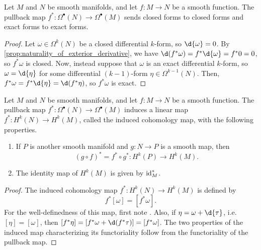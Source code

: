 \documentclass[a4paper,12pt]{article}
\begin{document}
\begin{lemma}\label{lem:pullback_closed_and_exact_forms}
    Let $M$ and $N$ be smooth manifolds, and let $f \colon M \to N$ be a smooth function.
    The pullback map $f^* \colon \Omega^\bullet(N) \to \Omega^\bullet(M)$ sends closed forms to closed forms and exact forms to exact forms.
\end{lemma}
\begin{proof}
    Let $\omega \in \Omega^k(N)$ be a closed differential $k$-form, so $\d{\omega} = 0$.
    By \cref{prop:naturality_of_exterior_derivative}, we have $\d(f^*\omega) = f^*\d{\omega} = f^*0 = 0$, so $f^*\omega$ is closed.
    Now, instead suppose that $\omega$ is an exact differential $k$-form, so $\omega = \d{\eta}$ for some differential $(k-1)$-form $\eta \in \Omega^{k-1}(N)$.
    Then, $f^*\omega = f^*\d{\eta} = \d(f^*\eta)$, so $f^*\omega$ is exact.
\end{proof}
\begin{proposition}\label{prop:induced_de_rham_cohomology_maps}
    Let $M$ and $N$ be smooth manifolds, and let $f \colon M \to N$ be a smooth function.
    The pullback map $f^* \colon \Omega^\bullet(N) \to \Omega^\bullet(M)$ induces a linear map $f^* \colon H^k(N) \to H^k(M)$, called the induced cohomology map, with the following properties.
    \begin{enumerate}
        \item If $P$ is another smooth manifold and $g \colon N \to P$ is a smooth map, then
        \begin{equation}
            (g \circ f)^* = f^* \circ g^* \colon H^k(P) \to H^k(M).
        \end{equation}
        \item The identity map of $H^k(M)$ is given by $\operatorname{id}_M^*$.
    \end{enumerate}
\end{proposition}
\begin{proof}
    The induced cohomology map $f^* \colon H^k(N) \to H^k(M)$ is defined by
    \begin{equation}
        f^*[\omega] = [f^*\omega].
    \end{equation}
    For the well-definedness of this map, first note .
    Also, if $\eta = \omega + \d{\tau}$, i.e. $[\eta] = [\omega]$, then $[f^*\eta] = [f^*\omega + \d(f^*\tau)] = [f^*\omega]$.
    The two properties of the induced map characterizing its functoriality follow from the functoriality of the pullback map.
\end{proof}
\end{document}
